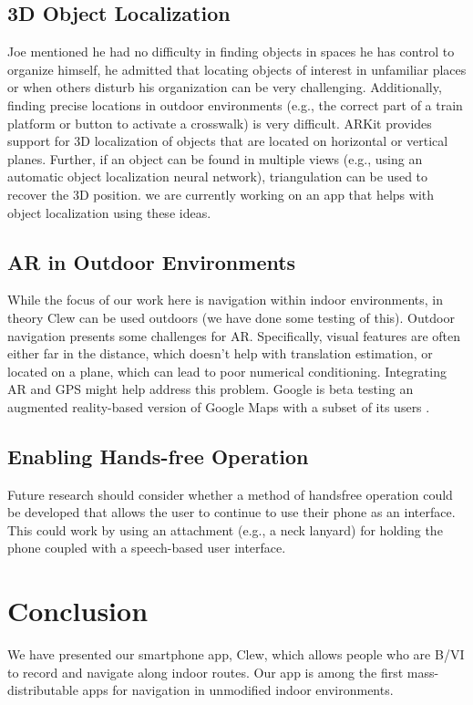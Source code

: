\documentclass[chi_draft]{sigchi}
\newcommand{\BVI}{B/VI\xspace}
\begin{document}
\subsection{3D Object Localization}

Joe mentioned he had no difficulty in finding objects in spaces he has control to organize himself, he admitted that locating objects of interest in unfamiliar places or when others disturb his organization can be very challenging. Additionally, finding precise locations in outdoor environments (e.g., the correct part of a train platform or button to activate a crosswalk) is very difficult.  ARKit provides support for 3D localization of objects that are located on horizontal or vertical planes.  Further, if an object can be found in multiple views (e.g., using an automatic object localization neural network), triangulation can be used to recover the 3D position.  we are currently working on an app that helps with object localization using these ideas.

\subsection{AR in Outdoor Environments}
While the focus of our work here is navigation within indoor environments, in theory Clew can be used outdoors (we have done some testing of this).  Outdoor navigation presents some challenges for AR.  Specifically, visual features are often either far in the distance, which doesn't help with translation estimation, or located on a plane, which can lead to poor numerical conditioning.  Integrating AR and GPS might help address this problem.  Google is beta testing an augmented reality-based version of Google Maps with a subset of its users \cite{gmapAR}.

\subsection{Enabling Hands-free Operation} 
Future research should consider whether a method of handsfree operation could be developed that allows the user to continue to use their phone as an interface.  This could work by using an attachment (e.g., a neck lanyard) for holding the phone coupled with a speech-based user interface. %

\section{Conclusion}
We have presented our smartphone app, Clew, which allows people who are \BVI to record and navigate along indoor routes.  Our app is among the first mass-distributable apps for navigation in unmodified indoor environments.%
\end{document}

